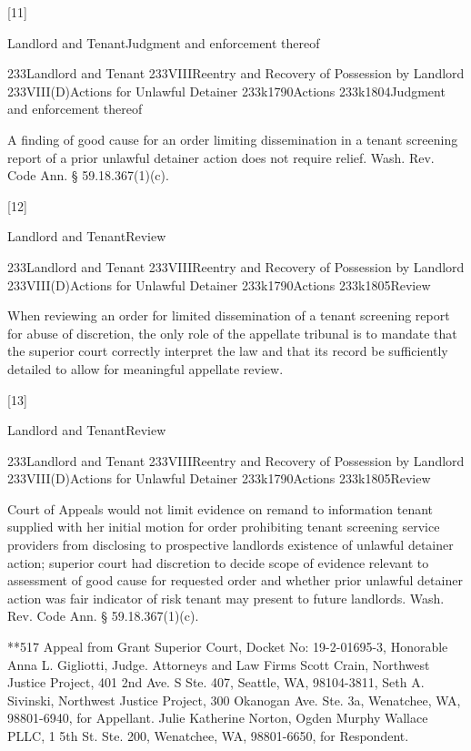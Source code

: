 \documentclass[11pt]{article}
\begin{document}
[11]

Landlord and TenantJudgment and enforcement thereof


233Landlord and Tenant
233VIIIReentry and Recovery of Possession by Landlord
233VIII(D)Actions for Unlawful Detainer
233k1790Actions
233k1804Judgment and enforcement thereof


A finding of good cause for an order limiting dissemination in a tenant screening report of a prior unlawful detainer action does not require relief. Wash. Rev. Code Ann. § 59.18.367(1)(c).




[12]

Landlord and TenantReview


233Landlord and Tenant
233VIIIReentry and Recovery of Possession by Landlord
233VIII(D)Actions for Unlawful Detainer
233k1790Actions
233k1805Review


When reviewing an order for limited dissemination of a tenant screening report for abuse of discretion, the only role of the appellate tribunal is to mandate that the superior court correctly interpret the law and that its record be sufficiently detailed to allow for meaningful appellate review.




[13]

Landlord and TenantReview


233Landlord and Tenant
233VIIIReentry and Recovery of Possession by Landlord
233VIII(D)Actions for Unlawful Detainer
233k1790Actions
233k1805Review


Court of Appeals would not limit evidence on remand to information tenant supplied with her initial motion for order prohibiting tenant screening service providers from disclosing to prospective landlords existence of unlawful detainer action; superior court had discretion to decide scope of evidence relevant to assessment of good cause for requested order and whether prior unlawful detainer action was fair indicator of risk tenant may present to future landlords. Wash. Rev. Code Ann. § 59.18.367(1)(c).




**517 Appeal from Grant Superior Court, Docket No: 19-2-01695-3, Honorable Anna L. Gigliotti, Judge.
Attorneys and Law Firms
Scott Crain, Northwest Justice Project, 401 2nd Ave. S Ste. 407, Seattle, WA, 98104-3811, Seth A. Sivinski, Northwest Justice Project, 300 Okanogan Ave. Ste. 3a, Wenatchee, WA, 98801-6940, for Appellant.
Julie Katherine Norton, Ogden Murphy Wallace PLLC, 1 5th St. Ste. 200, Wenatchee, WA, 98801-6650, for Respondent.
\end{document}
